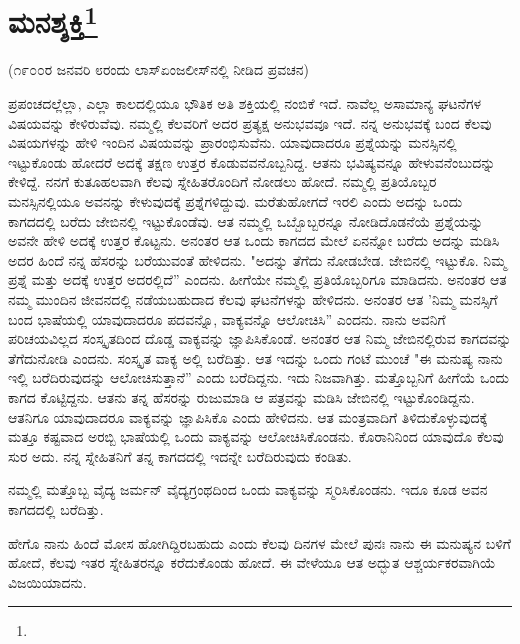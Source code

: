 
\chapter{ಮನಶ್ಶಕ್ತಿ\protect\footnote{}}

\begin{center}
(೧೯೦೦ರ ಜನವರಿ ೮ರಂದು ಲಾಸ್‌ಏಂಜಲೀಸ್‌ನಲ್ಲಿ ನೀಡಿದ ಪ್ರವಚನ)
\end{center}

ಪ್ರಪಂಚದಲ್ಲೆಲ್ಲಾ, ಎಲ್ಲಾ ಕಾಲದಲ್ಲಿಯೂ ಭೌತಿಕ ಅತಿ ಶಕ್ತಿಯಲ್ಲಿ ನಂಬಿಕೆ ಇದೆ. ನಾವೆಲ್ಲ ಅಸಾಮಾನ್ಯ ಘಟನೆಗಳ ವಿಷಯವನ್ನು ಕೇಳಿರುವೆವು. ನಮ್ಮಲ್ಲಿ ಕೆಲವರಿಗೆ ಅದರ ಪ್ರತ್ಯಕ್ಷ ಅನುಭವವೂ ಇದೆ. ನನ್ನ ಅನುಭವಕ್ಕೆ ಬಂದ ಕೆಲವು ವಿಷಯಗಳನ್ನು ಹೇಳಿ ಇಂದಿನ ವಿಷಯವನ್ನು ಪ್ರಾರಂಭಿಸುವೆನು. ಯಾವುದಾದರೂ ಪ್ರಶ್ನೆಯನ್ನು ಮನಸ್ಸಿನಲ್ಲಿ ಇಟ್ಟುಕೊಂಡು ಹೋದರೆ ಅದಕ್ಕೆ ತಕ್ಷಣ ಉತ್ತರ ಕೊಡುವವನೊಬ್ಬನಿದ್ದ. ಆತನು ಭವಿಷ್ಯವನ್ನೂ ಹೇಳುವನೆಂಬುದನ್ನು ಕೇಳಿದ್ದೆ. ನನಗೆ ಕುತೂಹಲವಾಗಿ ಕೆಲವು ಸ್ನೇಹಿತರೊಂದಿಗೆ ನೋಡಲು ಹೋದೆ. ನಮ್ಮಲ್ಲಿ ಪ್ರತಿಯೊಬ್ಬರ ಮನಸ್ಸಿನಲ್ಲಿಯೂ ಅವನನ್ನು ಕೇಳುವುದಕ್ಕೆ ಪ್ರಶ್ನೆಗಳಿದ್ದುವು. ಮರೆತುಹೋಗದೆ ಇರಲಿ ಎಂದು ಅದನ್ನು ಒಂದು ಕಾಗದದಲ್ಲಿ ಬರೆದು ಜೇಬಿನಲ್ಲಿ ಇಟ್ಟುಕೊಂಡೆವು. ಆತ ನಮ್ಮಲ್ಲಿ ಒಬ್ಬೊಬ್ಬರನ್ನೂ ನೋಡಿದೊಡನೆಯೆ ಪ್ರಶ್ನೆಯನ್ನು ಅವನೇ ಹೇಳಿ ಅದಕ್ಕೆ ಉತ್ತರ ಕೊಟ್ಟನು. ಅನಂತರ ಆತ ಒಂದು ಕಾಗದದ ಮೇಲೆ ಏನನ್ನೋ ಬರೆದು ಅದನ್ನು ಮಡಿಸಿ ಅದರ ಹಿಂದೆ ನನ್ನ ಹೆಸರನ್ನು ಬರೆಯುವಂತೆ ಹೇಳಿದನು. "ಅದನ್ನು ತೆಗೆದು ನೋಡಬೇಡ. ಜೇಬಿನಲ್ಲಿ ಇಟ್ಟುಕೊ. ನಿಮ್ಮ ಪ್ರಶ್ನೆ ಮತ್ತು ಅದಕ್ಕೆ ಉತ್ತರ ಅದರಲ್ಲಿದೆ'' ಎಂದನು. ಹೀಗೆಯೇ ನಮ್ಮಲ್ಲಿ ಪ್ರತಿಯೊಬ್ಬರಿಗೂ ಮಾಡಿದನು. ಅನಂತರ ಆತ ನಮ್ಮ ಮುಂದಿನ ಜೀವನದಲ್ಲಿ ನಡೆಯಬಹುದಾದ ಕೆಲವು ಘಟನೆಗಳನ್ನು ಹೇಳಿದನು. ಅನಂತರ ಆತ 'ನಿಮ್ಮ ಮನಸ್ಸಿಗೆ ಬಂದ ಭಾಷೆಯಲ್ಲಿ ಯಾವುದಾದರೂ ಪದವನ್ನೊ, ವಾಕ್ಯವನ್ನೊ ಆಲೋಚಿಸಿ'' ಎಂದನು. ನಾನು ಅವನಿಗೆ ಪರಿಚಯವಿಲ್ಲದ ಸಂಸ್ಕೃತದಿಂದ ದೊಡ್ಡ ವಾಕ್ಯವನ್ನು ಜ್ಞಾಪಿಸಿಕೊಂಡೆ. ಅನಂತರ ಆತ ನಿಮ್ಮ ಜೇಬಿನಲ್ಲಿರುವ ಕಾಗದವನ್ನು ತೆಗೆದುನೋಡಿ ಎಂದನು. ಸಂಸ್ಕೃತ ವಾಕ್ಯ ಅಲ್ಲಿ ಬರೆದಿತ್ತು. ಆತ ಇದನ್ನು ಒಂದು ಗಂಟೆ ಮುಂಚೆ "ಈ ಮನುಷ್ಯ ನಾನು ಇಲ್ಲಿ ಬರೆದಿರುವುದನ್ನು ಆಲೋಚಿಸುತ್ತಾನೆ'' ಎಂದು ಬರೆದಿದ್ದನು. ಇದು ನಿಜವಾಗಿತ್ತು. ಮತ್ತೊಬ್ಬನಿಗೆ ಹೀಗೆಯೆ ಒಂದು ಕಾಗದ ಕೊಟ್ಟಿದ್ದನು. ಆತನು ತನ್ನ ಹೆಸರನ್ನು ರುಜುಮಾಡಿ ಆ ಪತ್ರವನ್ನು ಮಡಿಸಿ ಜೇಬಿನಲ್ಲಿ ಇಟ್ಟುಕೊಂಡಿದ್ದನು. ಆತನಿಗೂ ಯಾವುದಾದರೂ ವಾಕ್ಯವನ್ನು ಜ್ಞಾಪಿಸಿಕೊ ಎಂದು ಹೇಳಿದನು. ಆತ ಮಂತ್ರವಾದಿಗೆ ತಿಳಿದುಕೊಳ್ಳುವುದಕ್ಕೆ ಮತ್ತೂ ಕಷ್ಟವಾದ ಅರಬ್ಬಿ ಭಾಷೆಯಲ್ಲಿ ಒಂದು ವಾಕ್ಯವನ್ನು ಆಲೋಚಿಸಿಕೊಂಡನು. ಕೊರಾನಿನಿಂದ ಯಾವುದೊ ಕೆಲವು ಸುರ ಅದು. ನನ್ನ ಸ್ನೇಹಿತನಿಗೆ ತನ್ನ ಕಾಗದದಲ್ಲಿ ಇದನ್ನೇ ಬರೆದಿರುವುದು ಕಂಡಿತು.

ನಮ್ಮಲ್ಲಿ ಮತ್ತೊಬ್ಬ ವೈದ್ಯ ಜರ್ಮನ್ ವೈದ್ಯಗ್ರಂಥದಿಂದ ಒಂದು ವಾಕ್ಯವನ್ನು ಸ್ಮರಿಸಿಕೊಂಡನು. ಇದೂ ಕೂಡ ಅವನ ಕಾಗದದಲ್ಲಿ ಬರೆದಿತ್ತು.

ಹೇಗೊ ನಾನು ಹಿಂದೆ ಮೋಸ ಹೋಗಿದ್ದಿರಬಹುದು ಎಂದು ಕೆಲವು ದಿನಗಳ ಮೇಲೆ ಪುನಃ ನಾನು ಈ ಮನುಷ್ಯನ ಬಳಿಗೆ ಹೋದೆ, ಕೆಲವು ಇತರ ಸ್ನೇಹಿತರನ್ನೂ ಕರೆದುಕೊಂಡು ಹೋದೆ. ಈ ವೇಳೆಯೂ ಆತ ಅದ್ಭುತ ಆಶ್ಚರ್ಯಕರವಾಗಿಯೆ ವಿಜಯಿಯಾದನು.

